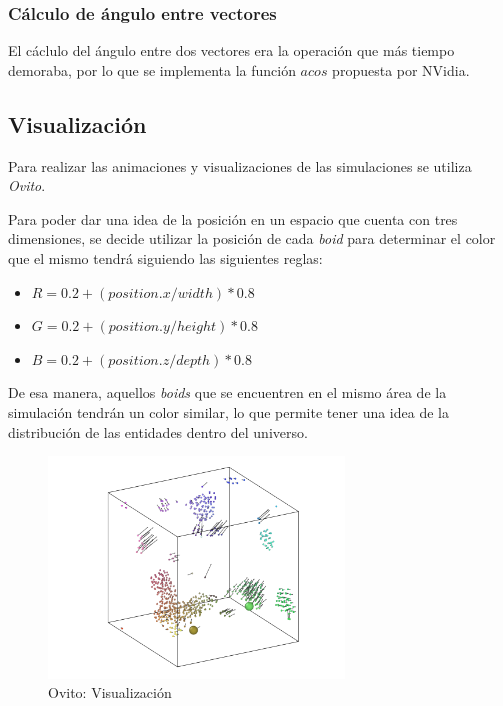 \documentclass[a4paper]{article}
\begin{document}
            \subsubsection{Cálculo de ángulo entre vectores}
                El cáclulo del ángulo entre dos vectores era la operación que más tiempo demoraba, por lo que se implementa la función $acos$ propuesta por NVidia\cite{FastAcos}.

        \pagebreak

        \subsection{Visualización}
            Para realizar las animaciones y visualizaciones de las simulaciones se utiliza \textit{Ovito}.

            Para poder dar una idea de la posición en un espacio que cuenta con tres dimensiones, se decide utilizar la posición de cada \textit{boid} para determinar el color que el mismo tendrá siguiendo las siguientes reglas:

            \begin{itemize}
                \item $R = 0.2 + (position.x / width) * 0.8$
                \item $G = 0.2 + (position.y / height) * 0.8$
                \item $B = 0.2 + (position.z / depth) * 0.8$
            \end{itemize}

            De esa manera, aquellos \textit{boids} que se encuentren en el mismo área de la simulación tendrán un color similar, lo que permite tener una idea de la distribución de las entidades dentro del universo.

            \begin{figure}[H]
                \centering
                \includegraphics[width=0.7\textwidth]{../imgs/ovito_viz}
                \caption{Ovito: Visualización}
                \label{fig:ovito_viz}
            \end{figure}
\end{document}
